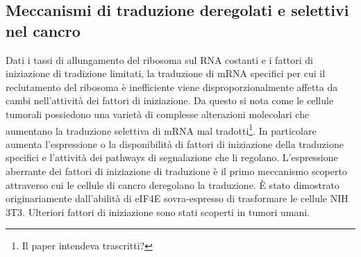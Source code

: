 	\subsection{Meccanismi di traduzione deregolati e selettivi nel cancro}
	Dati i tassi di allungamento del ribosoma sul RNA costanti e i fattori di iniziazione di tradizione limitati, la traduzione di mRNA specifici per cui il reclutamento del ribosoma \`e inefficiente viene disproporzionalmente affetta da cambi nell'attivit\`a dei fattori di iniziazione.
	Da questo si nota come le cellule tumorali possiedono una variet\`a di complesse alterazioni molecolari che aumentano la traduzione selettiva di mRNA mal tradotti\footnote{Il paper intendeva trascritti?}.
	In particolare aumenta l'espressione o la disponibilit\`a di fattori di iniziazione della traduzione specifici e l'attivit\`a dei pathways di segnalazione che li regolano.
	L'espressione aberrante dei fattori di iniziazione di traduzione \`e il primo meccanismo scoperto attraverso cui le cellule di cancro deregolano la traduzione.
	\`E stato dimostrato originariamente dall'abilit\`a di eIF4E sovra-espresso di trasformare le cellule NIH 3T3.
	Ulteriori fattori di iniziazione sono stati scoperti in tumori umani.

